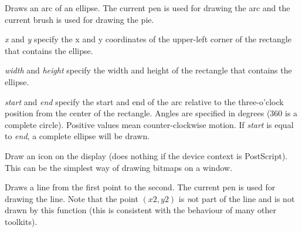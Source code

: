 


\label{wxdcdrawellipticarc}


Draws an arc of an ellipse. The current pen is used for drawing the arc and
the current brush is used for drawing the pie.

{\it x} and {\it y} specify the x and y coordinates of the upper-left corner of the rectangle that contains
the ellipse.

{\it width} and {\it height} specify the width and height of the rectangle that contains
the ellipse.

{\it start} and {\it end} specify the start and end of the arc relative to the three-o'clock
position from the center of the rectangle. Angles are specified
in degrees (360 is a complete circle). Positive values mean
counter-clockwise motion. If {\it start} is equal to {\it end}, a
complete ellipse will be drawn.


\label{wxdcdrawicon}


Draw an icon on the display (does nothing if the device context is PostScript).
This can be the simplest way of drawing bitmaps on a window.


\label{wxdcdrawline}


Draws a line from the first point to the second. The current pen is used
for drawing the line. Note that the point $(x2, y2)$ is {\emph not} part of the
line and is not drawn by this function (this is consistent with the behaviour
of many other toolkits).


\label{wxdcdrawlines}



